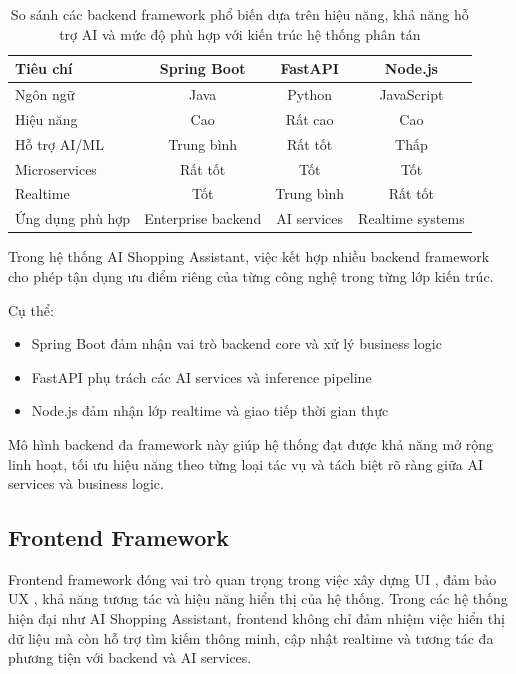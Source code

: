 \begin{table}[H]
\centering
\caption{So sánh các backend framework phổ biến dựa trên hiệu năng, khả năng hỗ trợ AI và mức độ phù hợp với kiến trúc hệ thống phân tán}
\label{tab:backend_framework}
\renewcommand{\arraystretch}{1.3}

\begin{tabular}{@{}lccc@{}}
\toprule
\textbf{Tiêu chí} & \textbf{Spring Boot} & \textbf{FastAPI} & \textbf{Node.js} \\
\midrule
Ngôn ngữ & Java & Python & JavaScript \\
Hiệu năng & Cao & Rất cao & Cao \\
Hỗ trợ AI/ML & Trung bình & Rất tốt & Thấp \\
Microservices & Rất tốt & Tốt & Tốt \\
Realtime & Tốt & Trung bình & Rất tốt \\
Ứng dụng phù hợp & Enterprise backend & AI services & Realtime systems \\
\bottomrule
\end{tabular}
\end{table}

Trong hệ thống AI Shopping Assistant, việc kết hợp nhiều backend framework cho phép tận dụng ưu điểm riêng của từng công nghệ trong từng lớp kiến trúc.

Cụ thể:
\begin{itemize}
    \item Spring Boot đảm nhận vai trò backend core và xử lý business logic
    \item FastAPI phụ trách các AI services và inference pipeline
    \item Node.js đảm nhận lớp realtime và giao tiếp thời gian thực
\end{itemize}

Mô hình backend đa framework này giúp hệ thống đạt được khả năng mở rộng linh hoạt, tối ưu hiệu năng theo từng loại tác vụ và tách biệt rõ ràng giữa AI services và business logic.
\subsection{Frontend Framework}

Frontend framework đóng vai trò quan trọng trong việc xây dựng UI , đảm bảo UX , khả năng tương tác và hiệu năng hiển thị của hệ thống. Trong các hệ thống hiện đại như AI Shopping Assistant, frontend không chỉ đảm nhiệm việc hiển thị dữ liệu mà còn hỗ trợ tìm kiếm thông minh, cập nhật realtime và tương tác đa phương tiện với backend và AI services.

